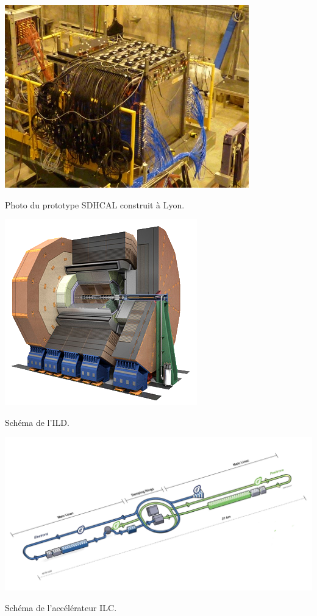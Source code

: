\marginpar
{
	\centering
	\includegraphics[width=\marginparwidth]{GLA/SDHCAL.jpg}
	\captionsetup{type=figure}\caption{Photo du prototype SDHCAL construit à Lyon.}
	\label{SDHCAL}
}

\marginpar
{
	\centering
	\includegraphics[width=\marginparwidth]{GLA/ILD.png}
	\captionsetup{type=figure}\caption{Schéma de l'ILD.}
	\label{ILD}
}

\marginpar
{
	\centering
	\includegraphics[width=\marginparwidth]{GLA/ILC.png}
	\captionsetup{type=figure}\caption{Schéma de l'accélérateur ILC.}
	\label{ILC}
}

